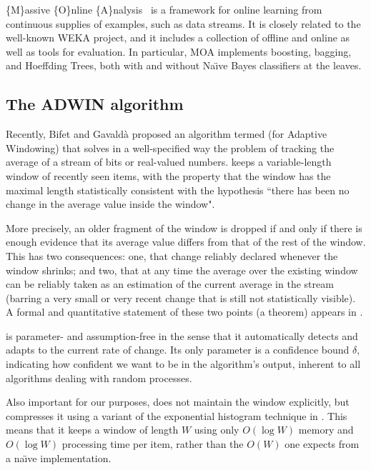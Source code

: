 \{M\}assive \{O\}nline \{A\}nalysis~\cite{MOA} is a
framework for online learning from continuous supplies of examples, such as data streams.
It is closely related to the well-known WEKA project, and it includes 
a collection of offline and online as well as tools for evaluation. 
In particular, MOA implements boosting, bagging, and Hoeffding Trees, both 
with and without Na{\"\i}ve Bayes classifiers at the leaves. 

\subsection{The ADWIN algorithm}

Recently, Bifet and Gavald\`a \cite{bif-gav} proposed an algorithm termed \adwin (for 
Adaptive Windowing) that solves in a well-specified way the problem
of tracking the average of a stream of bits or real-valued numbers.
\adwin keeps a variable-length window of recently seen items, with the property 
that the window has the maximal length statistically consistent 
with the hypothesis ``there has been no change in the average value inside the window". 

More precisely, an older fragment of the window is dropped if and only if 
there is enough evidence that its average value differs from that of 
the rest of the window. 
This has two consequences: one, that change reliably declared whenever
the window shrinks; and two, that at any time the average over the existing
window can be reliably taken as an estimation of the current average in the stream
(barring a very small or very recent change that is still not statistically 
visible). A formal and quantitative statement of these two points (a theorem)
appears in \cite{bif-gav}. 

\adwin is parameter- and assumption-free in the sense that 
it automatically detects and adapts to the current rate of change. 
Its only parameter is a confidence bound $\delta$,
indicating how confident we want to be in the algorithm's output, 
inherent to all algorithms dealing with random processes. 

Also important for our purposes, \adwin does not maintain the window
explicitly, but compresses it using a variant of the exponential histogram
technique in \cite{babcock-sampling}. This means that it keeps a window of length $W$
using only $O(\log W)$ memory and $O(\log W)$ processing time per item, 
rather than the $O(W)$ one expects from a na{\"\i}ve implementation. 
\ENDOMIT

